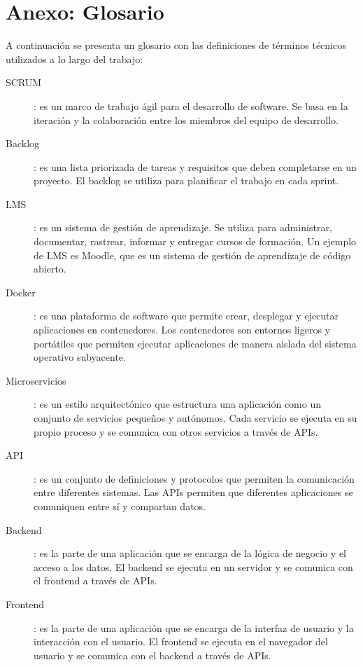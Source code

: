 \chapter*{Anexo: Glosario}

A continuación se presenta un glosario con las definiciones de términos técnicos utilizados a lo largo del trabajo:

\begin{description}
    \item [\hypertarget{scrum}{SCRUM}]: es un marco de trabajo ágil para el desarrollo de software. Se basa en la iteración y la colaboración entre los miembros del equipo de desarrollo.
    \item [\hypertarget{backlog}{Backlog}]: es una lista priorizada de tareas y requisitos que deben completarse en un proyecto. El backlog se utiliza para planificar el trabajo en cada sprint.
    \item [\hypertarget{lms}{LMS}]: es un sistema de gestión de aprendizaje. Se utiliza para administrar, documentar, rastrear, informar y entregar cursos de formación. Un ejemplo de LMS es Moodle, que es un sistema de gestión de aprendizaje de código abierto.
    \item [\hypertarget{docker}{Docker}]: es una plataforma de software que permite crear, desplegar y ejecutar aplicaciones en contenedores. Los contenedores son entornos ligeros y portátiles que permiten ejecutar aplicaciones de manera aislada del sistema operativo subyacente.
    \item [\hypertarget{microservicios}{Microservicios}]: es un estilo arquitectónico que estructura una aplicación como un conjunto de servicios pequeños y autónomos. Cada servicio se ejecuta en su propio proceso y se comunica con otros servicios a través de APIs.
    \item [\hypertarget{api}{API}]: es un conjunto de definiciones y protocolos que permiten la comunicación entre diferentes sistemas. Las APIs permiten que diferentes aplicaciones se comuniquen entre sí y compartan datos.
    \item [\hypertarget{backend}{Backend}]: es la parte de una aplicación que se encarga de la lógica de negocio y el acceso a los datos. El backend se ejecuta en un servidor y se comunica con el frontend a través de APIs.
    \item [\hypertarget{frontend}{Frontend}]: es la parte de una aplicación que se encarga de la interfaz de usuario y la interacción con el usuario. El frontend se ejecuta en el navegador del usuario y se comunica con el backend a través de APIs.

\end{description}
